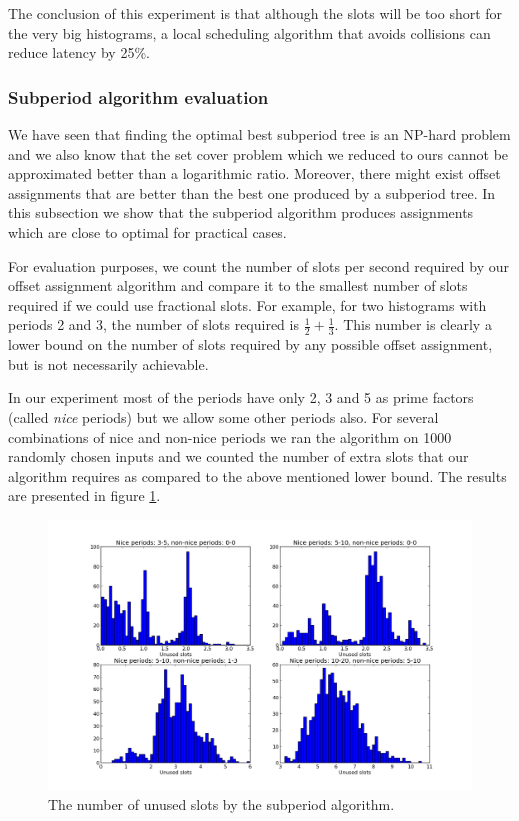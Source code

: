 The conclusion of this experiment is that although the slots will be too short for the very big histograms, a local scheduling algorithm that avoids collisions can reduce latency by 25\%.


\subsubsection*{Subperiod algorithm evaluation}

We have seen that finding the optimal best subperiod tree is an NP-hard problem and we also know that the set cover problem which we reduced to ours cannot be approximated better than a logarithmic ratio. Moreover, there might exist offset assignments that are better than the best one produced by a subperiod tree. In this subsection we show that the subperiod algorithm produces assignments which are close to optimal for practical cases. 

For evaluation purposes, we count the number of slots per second required by our offset assignment algorithm and compare it to the smallest number of slots required if we could use fractional slots. For example, for two histograms with periods 2 and 3, the number of slots required is $\frac 1 2 + \frac 1 3$. This number is clearly a lower bound on the number of slots required by any possible offset assignment, but is not necessarily achievable.

In our experiment most of the periods have only 2, 3 and 5 as prime factors (called \emph{nice} periods) but we allow some other periods also. For several combinations of nice and non-nice periods we ran the algorithm on 1000 randomly chosen inputs and we counted the number of extra slots that our algorithm requires as compared to the above mentioned lower bound. The results are presented in figure \ref{fig:unused_slots}.

\begin{figure}[ht]
\centering
\includegraphics[scale=0.40]{Images/unused_slots.png}
\caption{The number of unused slots by the subperiod algorithm. }
\label{fig:unused_slots}
\end{figure}

